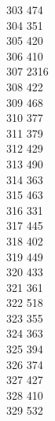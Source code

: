 { 303	474 \\
 304	351 \\
 305	420 \\
 306	410 \\
 307	2316 \\
 308	422 \\
 309	468 \\
 310	377 \\
 311	379 \\
 312	429 \\
 313	490 \\
 314	363 \\
 315	463 \\
 316	331 \\
 317	445 \\
 318	402 \\
 319	449 \\
 320	433 \\
 321	361 \\
 322	518 \\
 323	355 \\
 324	363 \\
 325	394 \\
 326	374 \\
 327	427 \\
 328	410 \\
 329	532 \\
}
